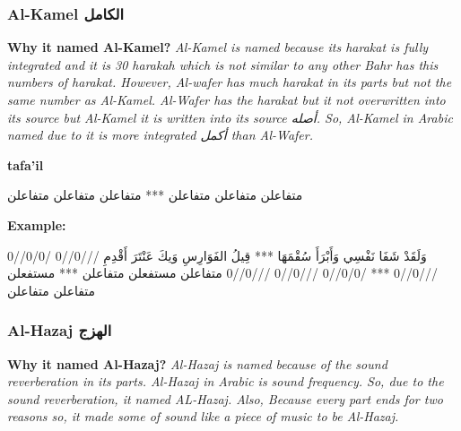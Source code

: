 
\subsubsection{Al-Kamel \textarabic{الكامل}}
\textbf{Why it named Al-Kamel?}
\textit{Al-Kamel is named because its harakat is fully integrated and it is 30 harakah which is not similar to any other Bahr has this numbers of harakat. However, Al-wafer has much harakat in its parts but not the same number as Al-Kamel. Al-Wafer has the harakat but it not overwritten into its source but Al-Kamel it is written into its source \textarabic{أصله}. So, Al-Kamel in Arabic named due to it is more integrated  \textarabic{أكمل} than Al-Wafer. 
}


\textbf{tafa'il}

\begin{Arabic}
	\begin{traditionalpoem*}
متفاعلن متفاعلن متفاعلن *** متفاعلن متفاعلن متفاعلن
          

	\end{traditionalpoem*}
      \end{Arabic}


\textbf{Example:}

\begin{Arabic}
	\begin{traditionalpoem*}
وَلَقَدْ شَفَا نَفْسِي وَأَبْرَأَ سُقْمَهَا *** قِيلُ الفَوَارِسِ وَيكَ عَنْتَرَ أَقْدِمِ
///0//0 /0/0//0 ///0//0 ***  /0/0//0 ///0//0 ///0//0
متفاعلن مستفعلن متفاعلن *** مستفعلن متفاعلن متفاعلن
          
	\end{traditionalpoem*}
      \end{Arabic}
      

\subsubsection{Al-Hazaj \textarabic{الهزج}}
\textbf{Why it named Al-Hazaj?}
\textit{Al-Hazaj is named because of the sound reverberation in its parts. Al-Hazaj in Arabic is sound frequency. So, due to the sound reverberation, it named AL-Hazaj. Also, Because every part ends for two reasons so, it made some of sound like a piece of music to be Al-Hazaj.  }

